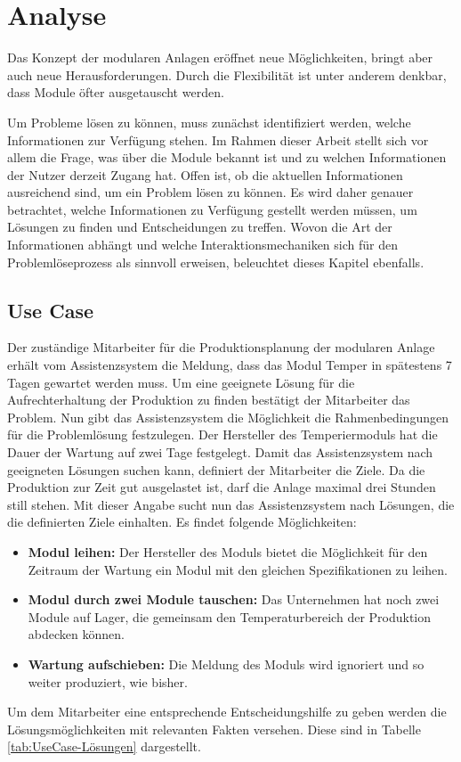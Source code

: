 
\chapter{Analyse}
\label{sec:Anforderungsanalyse}
Das Konzept der modularen Anlagen eröffnet neue Möglichkeiten, bringt aber auch neue Herausforderungen. Durch die Flexibilität ist unter anderem denkbar, dass Module öfter ausgetauscht werden.

Um Probleme lösen zu können, muss zunächst identifiziert werden, welche Informationen zur Verfügung stehen. Im Rahmen dieser Arbeit stellt sich vor allem die Frage, was über die Module bekannt ist und zu welchen Informationen der Nutzer derzeit Zugang hat.  Offen ist, ob die aktuellen Informationen ausreichend sind, um ein Problem lösen zu können. Es wird daher genauer betrachtet, welche Informationen zu Verfügung gestellt werden müssen, um Lösungen zu finden und Entscheidungen zu treffen. Wovon die Art der Informationen abhängt und welche Interaktionsmechaniken sich für den Problemlöseprozess als sinnvoll erweisen, beleuchtet dieses Kapitel ebenfalls.

\section{Use Case}
Der zuständige Mitarbeiter für die Produktionsplanung der modularen Anlage erhält vom Assistenzsystem die Meldung, dass das Modul Temper in spätestens 7 Tagen gewartet werden muss. Um eine geeignete Lösung für die Aufrechterhaltung der Produktion zu finden bestätigt der Mitarbeiter das Problem. Nun gibt das Assistenzsystem die Möglichkeit die Rahmenbedingungen für die Problemlösung festzulegen. Der Hersteller des Temperiermoduls hat die Dauer der Wartung auf zwei Tage festgelegt. Damit das Assistenzsystem nach geeigneten Lösungen suchen kann, definiert der Mitarbeiter die Ziele. Da die Produktion zur Zeit gut ausgelastet ist, darf die Anlage maximal drei Stunden still stehen. Mit dieser Angabe sucht nun das Assistenzsystem nach Lösungen, die die definierten Ziele einhalten. Es findet folgende Möglichkeiten:
\begin{itemize}
\item \textbf{Modul leihen:} Der Hersteller des Moduls bietet die Möglichkeit für den Zeitraum der Wartung ein Modul mit den gleichen Spezifikationen zu leihen.
\item \textbf{Modul durch zwei Module tauschen:} Das Unternehmen hat noch zwei Module auf Lager, die gemeinsam den Temperaturbereich der Produktion abdecken können.
\item \textbf{Wartung aufschieben:} Die Meldung des Moduls wird ignoriert und so weiter produziert, wie bisher.
\end{itemize}
Um dem Mitarbeiter eine entsprechende Entscheidungshilfe zu geben werden die Lösungsmöglichkeiten mit relevanten Fakten versehen. Diese sind in Tabelle \ref{tab:UseCase-Lösungen} dargestellt.

